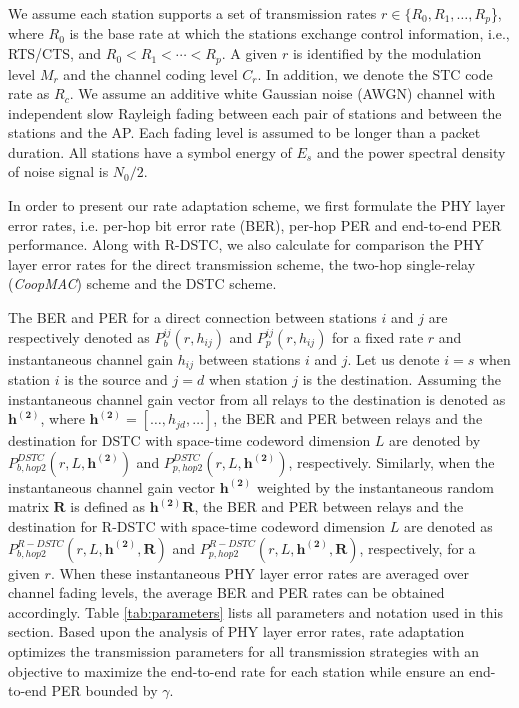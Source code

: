 \documentclass[peerreview,draftcls,onecolumn,12pt,a4paper]{IEEEtran}
\begin{document}
We assume each station supports a set of transmission rates $r \in
\{R_0, R_1, \ldots, R_p$\}, where $R_0$ is the base rate at which
the stations exchange control information, i.e., RTS/CTS, and
$R_0<R_1<\cdots<R_p$. A given $r$ is identified by the modulation
level $M_r$ and the channel coding level $C_r$. In addition, we
denote the STC code rate as $R_c$. We assume an additive white
Gaussian noise (AWGN) channel with independent slow Rayleigh
fading between each pair of stations and between the stations and
the AP. Each fading level is assumed to be longer than a packet
duration. All stations have a symbol energy of $E_{s}$ and the
power spectral density of noise signal is $N_0/2$.

In order to present our rate adaptation scheme, we first formulate
the PHY layer error rates, i.e. per-hop bit error rate (BER),
per-hop PER and
end-to-end PER performance. Along with R-DSTC, we also calculate for comparison the PHY layer
error rates for the direct transmission scheme, the two-hop
single-relay ({\em CoopMAC}) scheme and the DSTC scheme.

The BER and PER for a direct connection between stations $i$ and
$j$ are respectively denoted as $P_{b}^{ij}(r,h_{ij})$ and
$P_{p}^{ij}(r,h_{ij})$ for a fixed rate $r$ and instantaneous
channel gain $h_{ij}$ between stations $i$ and $j$. Let us denote
$i=s$ when station $i$ is the source and $j=d$ when station $j$ is
the destination. Assuming the instantaneous channel gain vector
from all relays to the destination is denoted as
$\mathbf{h^{(2)}}$, where $\mathbf{h^{(2)}}=[ \dots, h_{jd},
\dots]$, the BER and PER between relays and the destination for
DSTC with space-time codeword dimension $L$ are denoted by
$P_{b,hop2}^{DSTC}(r,L, \mathbf{h^{(2)}})$ and
$P_{p,hop2}^{DSTC}(r,L,\mathbf{h^{(2)}})$, respectively.
Similarly, when the instantaneous channel gain vector
$\mathbf{h^{(2)}}$ weighted by the instantaneous random matrix
$\mathbf{R}$ is defined as $\mathbf{h^{(2)}R}$, the BER and PER
between relays and the destination for R-DSTC with space-time
codeword dimension $L$ are denoted as
$P_{b,hop2}^{R-DSTC}(r,L,\mathbf{h^{(2)},R})$ and
$P_{p,hop2}^{R-DSTC}(r,L,\mathbf{h^{(2)}, R})$, respectively, for
a given $r$. When these instantaneous PHY layer error rates are
averaged over channel fading levels, the average BER and PER rates
can be obtained accordingly. Table \ref{tab:parameters} lists all
parameters and notation used in this section. Based upon the
analysis of PHY layer error rates, rate adaptation optimizes the
transmission parameters for all transmission strategies with an
objective to maximize the end-to-end rate for each station while
ensure an end-to-end PER bounded by $\gamma$.
\end{document}
